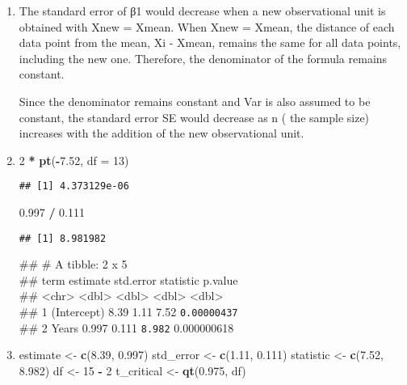 \documentclass[
]{article}
\newenvironment{Shaded}{\begin{snugshade}}{\end{snugshade}}
\newcommand{\AttributeTok}[1]{\textcolor[rgb]{0.13,0.29,0.53}{#1}}
\newcommand{\DecValTok}[1]{\textcolor[rgb]{0.00,0.00,0.81}{#1}}
\newcommand{\FloatTok}[1]{\textcolor[rgb]{0.00,0.00,0.81}{#1}}
\newcommand{\FunctionTok}[1]{\textcolor[rgb]{0.13,0.29,0.53}{\textbf{#1}}}
\newcommand{\NormalTok}[1]{#1}
\newcommand{\OtherTok}[1]{\textcolor[rgb]{0.56,0.35,0.01}{#1}}
\newcommand{\SpecialCharTok}[1]{\textcolor[rgb]{0.81,0.36,0.00}{\textbf{#1}}}
\begin{document}
\begin{enumerate}
\def\labelenumi{\arabic{enumi}.}
\item
  The standard error of β1 would decrease when a new observational unit
  is obtained with Xnew = Xmean. When Xnew = Xmean, the distance of each
  data point from the mean, Xi - Xmean, remains the same for all data
  points, including the new one. Therefore, the denominator of the
  formula remains constant.

  Since the denominator remains constant and Var is also assumed to be
  constant, the standard error SE would decrease as n ( the sample size)
  increases with the addition of the new observational unit.
\item
\begin{Shaded}
\begin{Highlighting}[]
\DecValTok{2} \SpecialCharTok{*} \FunctionTok{pt}\NormalTok{(}\SpecialCharTok{{-}}\FloatTok{7.52}\NormalTok{, }\AttributeTok{df =} \DecValTok{13}\NormalTok{)}
\end{Highlighting}
\end{Shaded}

\begin{verbatim}
## [1] 4.373129e-06
\end{verbatim}

\begin{Shaded}
\begin{Highlighting}[]
\FloatTok{0.997} \SpecialCharTok{/} \FloatTok{0.111}
\end{Highlighting}
\end{Shaded}

\begin{verbatim}
## [1] 8.981982
\end{verbatim}

  \#\# \# A tibble: 2 x 5\\
  \#\# term estimate std.error statistic p.value\\
  \#\# \textless chr\textgreater{} \textless dbl\textgreater{}
  \textless dbl\textgreater{} \textless dbl\textgreater{}
  \textless dbl\textgreater{}\\
  \#\# 1 (Intercept) 8.39 1.11 7.52 \texttt{0.00000437}\\
  \#\# 2 Years 0.997 0.111 \texttt{8.982} 0.000000618
\item
\begin{Shaded}
\begin{Highlighting}[]
\NormalTok{estimate }\OtherTok{\textless{}{-}} \FunctionTok{c}\NormalTok{(}\FloatTok{8.39}\NormalTok{, }\FloatTok{0.997}\NormalTok{)}
\NormalTok{std\_error }\OtherTok{\textless{}{-}} \FunctionTok{c}\NormalTok{(}\FloatTok{1.11}\NormalTok{, }\FloatTok{0.111}\NormalTok{)}
\NormalTok{statistic }\OtherTok{\textless{}{-}} \FunctionTok{c}\NormalTok{(}\FloatTok{7.52}\NormalTok{, }\FloatTok{8.982}\NormalTok{)}
\NormalTok{df }\OtherTok{\textless{}{-}} \DecValTok{15} \SpecialCharTok{{-}} \DecValTok{2}
\NormalTok{t\_critical }\OtherTok{\textless{}{-}} \FunctionTok{qt}\NormalTok{(}\FloatTok{0.975}\NormalTok{, df)}


\end{Highlighting}
\end{Shaded}
\end{enumerate}
\end{document}
